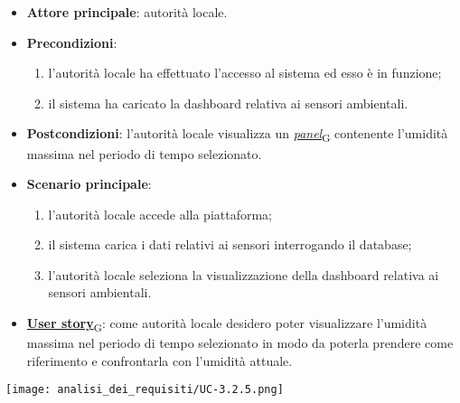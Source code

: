 \begin{itemize}
	\item \textbf{Attore principale}: autorità locale.
	\item \textbf{Precondizioni}:
	      \begin{enumerate}
		      \item l'autorità locale ha effettuato l'accesso al sistema ed esso è in funzione;
		      \item il sistema ha caricato la dashboard relativa ai sensori ambientali.
	      \end{enumerate}
	\item \textbf{Postcondizioni}: l'autorità locale visualizza un \href{https://7last.github.io/docs/pb/documentazione-interna/glossario\#panel}{\textit{panel}\textsubscript{G}} contenente l'umidità massima nel periodo di tempo selezionato.
	\item \textbf{Scenario principale}:
	      \begin{enumerate}
		      \item l'autorità locale accede alla piattaforma;
		      \item il sistema carica i dati relativi ai sensori interrogando il database;
		      \item l'autorità locale seleziona la visualizzazione della dashboard relativa ai sensori ambientali.
	      \end{enumerate}
	\item \href{https://7last.github.io/docs/pb/documentazione-interna/glossario\#user-story}{\textbf{User story}\textsubscript{G}}:
	      come autorità locale desidero poter visualizzare l'umidità massima nel periodo di tempo selezionato
	      in modo da poterla prendere come riferimento e confrontarla con l'umidità attuale.
\end{itemize}
\begin{center}
	\texttt{[image: analisi\_dei\_requisiti/UC-3.2.5.png]}
\end{center}


